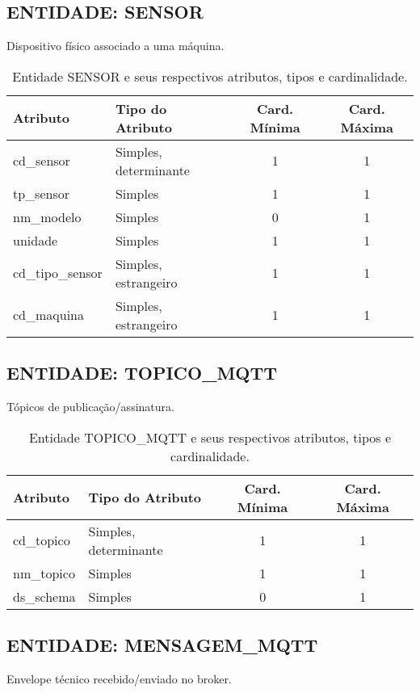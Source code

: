 \documentclass[10pt,a4paper]{article}
\begin{document}
\subsection*{ENTIDADE: SENSOR}
Dispositivo físico associado a uma máquina.

\begin{table}[h!]
\centering
\begin{tabular}{| l | l | c | c |}
\hline
\rowcolor{red}\color{white}\textbf{Atributo} & \color{white}\textbf{Tipo do Atributo} & \color{white}\textbf{Card. Mínima} & \color{white}\textbf{Card. Máxima} \\
\hline
cd\_sensor & Simples, determinante & 1 & 1 \\
tp\_sensor & Simples & 1 & 1 \\
nm\_modelo & Simples & 0 & 1 \\
unidade & Simples & 1 & 1 \\
cd\_tipo\_sensor & Simples, estrangeiro & 1 & 1 \\
cd\_maquina & Simples, estrangeiro & 1 & 1 \\
\hline
\end{tabular}
\caption{Entidade SENSOR e seus respectivos atributos, tipos e cardinalidade.}
\label{tab:sensor}
\end{table}

\subsection*{ENTIDADE: TOPICO\_MQTT}
Tópicos de publicação/assinatura.

\begin{table}[h!]
\centering
\begin{tabular}{| l | l | c | c |}
\hline
\rowcolor{red}\color{white}\textbf{Atributo} & \color{white}\textbf{Tipo do Atributo} & \color{white}\textbf{Card. Mínima} & \color{white}\textbf{Card. Máxima} \\
\hline
cd\_topico & Simples, determinante & 1 & 1 \\
nm\_topico & Simples & 1 & 1 \\
ds\_schema & Simples & 0 & 1 \\
\hline
\end{tabular}
\caption{Entidade TOPICO\_MQTT e seus respectivos atributos, tipos e cardinalidade.}
\label{tab:topico_mqtt}
\end{table}

\subsection*{ENTIDADE: MENSAGEM\_MQTT}
Envelope técnico recebido/enviado no broker.
\end{document}
